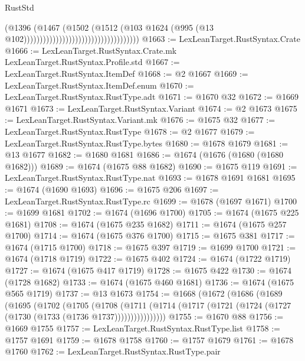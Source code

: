 \begin{lexlean}{RustStd}
\begin{coremodule}
                                                              (@1396
                                                                (@1467
                                                                  (@1502
                                                                    (@1512
                                                                      (@103
                                                                        @1624
                                                                        (@995
                                                                          (@13
                                                                            @102))))))))))))))))))))))))))))))))))))
@1663 := LexLeanTarget.RustSyntax.Crate
@1666 := LexLeanTarget.RustSyntax.Crate.mk LexLeanTarget.RustSyntax.Profile.std
@1667 := LexLeanTarget.RustSyntax.ItemDef
@1668 := @2 @1667
@1669 := LexLeanTarget.RustSyntax.ItemDef.enum
@1670 := LexLeanTarget.RustSyntax.RustType.adt
@1671 := @1670 @32
@1672 := @1669 @1671
@1673 := LexLeanTarget.RustSyntax.Variant
@1674 := @2 @1673
@1675 := LexLeanTarget.RustSyntax.Variant.mk
@1676 := @1675 @32
@1677 := LexLeanTarget.RustSyntax.RustType
@1678 := @2 @1677
@1679 := LexLeanTarget.RustSyntax.RustType.bytes
@1680 := @1678 @1679
@1681 := @13 @1677
@1682 := @1680 @1681
@1686 := @1674 (@1676 (@1680 (@1680 @1682)))
@1689 := @1674 (@1675 @88 @1682)
@1690 := @1675 @119
@1691 := LexLeanTarget.RustSyntax.RustType.nat
@1693 := @1678 @1691 @1681
@1695 := @1674 (@1690 @1693)
@1696 := @1675 @206
@1697 := LexLeanTarget.RustSyntax.RustType.rc
@1699 := @1678 (@1697 @1671)
@1700 := @1699 @1681
@1702 := @1674 (@1696 @1700)
@1705 := @1674 (@1675 @225 @1681)
@1708 := @1674 (@1675 @235 @1682)
@1711 := @1674 (@1675 @257 @1700)
@1714 := @1674 (@1675 @376 @1700)
@1715 := @1675 @381
@1717 := @1674 (@1715 @1700)
@1718 := @1675 @397
@1719 := @1699 @1700
@1721 := @1674 (@1718 @1719)
@1722 := @1675 @402
@1724 := @1674 (@1722 @1719)
@1727 := @1674 (@1675 @417 @1719)
@1728 := @1675 @422
@1730 := @1674 (@1728 @1682)
@1733 := @1674 (@1675 @460 @1681)
@1736 := @1674 (@1675 @565 @1719)
@1737 := @13 @1673
@1754 := @1668
    (@1672
      (@1686
        (@1689
          (@1695
            (@1702
              (@1705
                (@1708
                  (@1711
                    (@1714 (@1717 (@1721 (@1724 (@1727 (@1730 (@1733 (@1736 @1737))))))))))))))))
@1755 := @1670 @88
@1756 := @1669 @1755
@1757 := LexLeanTarget.RustSyntax.RustType.list
@1758 := @1757 @1691
@1759 := @1678 @1758
@1760 := @1757 @1679
@1761 := @1678 @1760
@1762 := LexLeanTarget.RustSyntax.RustType.pair

\end{coremodule}
\end{lexlean}
